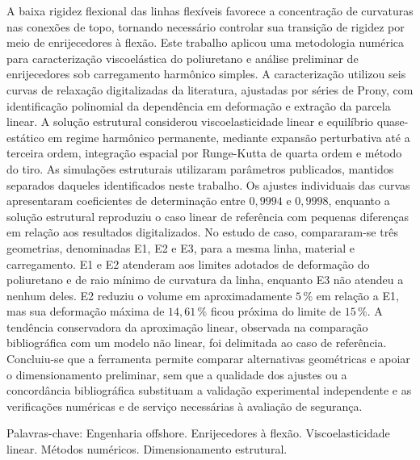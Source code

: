\documentclass[arial,centeredequations,english,brazilian,oneside,section=TITLE]{ifes8}
\begin{document}
\begin{resumo}

  A baixa rigidez flexional das linhas flexíveis favorece a concentração de curvaturas
  nas conexões de topo, tornando necessário controlar sua transição de rigidez por meio
  de enrijecedores à flexão. Este trabalho aplicou uma metodologia numérica para
  caracterização viscoelástica do poliuretano e análise preliminar de enrijecedores
  sob carregamento harmônico simples. A caracterização utilizou seis curvas de
  relaxação digitalizadas da literatura, ajustadas por séries de Prony, com
  identificação polinomial da dependência em deformação e extração da parcela linear.
  A solução estrutural considerou viscoelasticidade linear e equilíbrio
  quase-estático em regime harmônico permanente, mediante expansão perturbativa até
  a terceira ordem, integração espacial por Runge-Kutta de quarta ordem e método
  do tiro. As simulações estruturais utilizaram parâmetros publicados, mantidos
  separados daqueles identificados neste trabalho. Os ajustes individuais das curvas
  apresentaram coeficientes de determinação entre $0{,}9994$ e $0{,}9998$, enquanto
  a solução estrutural reproduziu o caso linear de referência com pequenas diferenças
  em relação aos resultados digitalizados. No estudo de caso, compararam-se três
  geometrias, denominadas E1, E2 e E3, para a mesma linha, material e carregamento.
  E1 e E2 atenderam aos limites adotados de deformação do poliuretano e de raio mínimo
  de curvatura da linha, enquanto E3 não atendeu a nenhum deles. E2 reduziu o volume em
  aproximadamente $5\,\%$ em relação a E1, mas sua deformação máxima de
  $14{,}61\,\%$ ficou próxima do limite de $15\,\%$. A tendência conservadora da
  aproximação linear, observada na comparação bibliográfica com um modelo não linear,
  foi delimitada ao caso de referência. Concluiu-se que a ferramenta permite
  comparar alternativas geométricas e apoiar o dimensionamento preliminar, sem que
  a qualidade dos ajustes ou a concordância bibliográfica substituam a validação
  experimental independente e as verificações numéricas e de serviço necessárias
  à avaliação de segurança.

  Palavras-chave: Engenharia offshore. Enrijecedores à flexão. Viscoelasticidade linear. Métodos numéricos. Dimensionamento estrutural.
\end{resumo}
\end{document}
